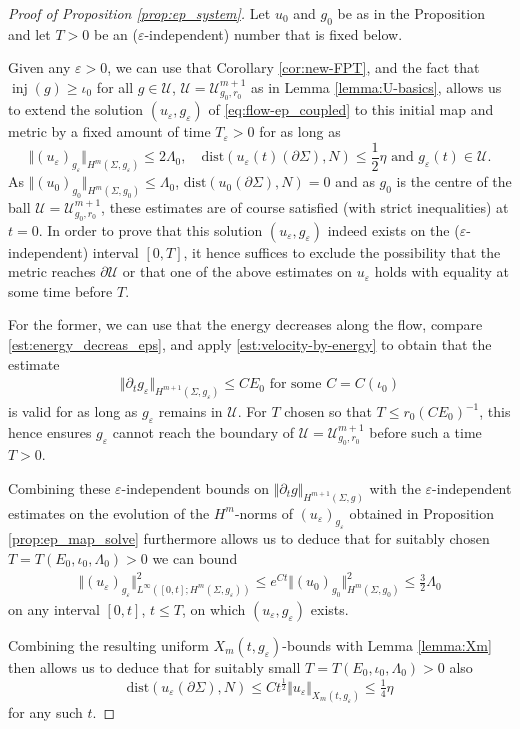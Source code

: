 \documentclass[10pt,reqno]{amsart}
\theoremstyle{plain}
\theoremstyle{definition}
\numberwithin{equation}{section}
\newcommand{\La}{\Lambda}
\newcommand{\Si}{\Sigma}
\newcommand{\ep}{\varepsilon}
\DeclareMathOperator{\inj}{inj}
\newcommand{\norm}[1]{\Vert#1\Vert}
\newcommand{\beq}{\begin{equation}}
\newcommand{\eeq}{\end{equation}}
\newcommand{\beqa}{\begin{equation}\begin{aligned}}
\newcommand{\eeqa}{\end{aligned}\end{equation}}
\newcommand{\beqas}{\begin{equation*}\begin{aligned}}
\newcommand{\eeqas}{\end{aligned}\end{equation*}}
\newcommand{\half}{\frac{1}{2}}
\newcommand{\pt}{\partial_t}
\newcommand{\eps}{\varepsilon}
\newcommand{\dist}{\text{dist}}
\newcommand{\pSi}{{\partial \Sigma}}
\newcommand{\UU}{{\mathcal U}}
\begin{document}
\begin{proof}[Proof of Proposition \ref{prop:ep_system}]
    Let $u_0$ and $g_0$ be as in the Proposition and let $T>0$ be an ($\eps$-independent) number that is fixed below. 
   
    Given any $\eps>0$, we can use that Corollary \ref{cor:new-FPT}, and the fact that $\inj(g)\geq \iota_0$ for 
   all $g\in  \UU$, $\UU=\UU_{g_0,r_0}^{m+1}$ as in Lemma \ref{lemma:U-basics},
   allows us to extend the solution $(u_\eps,g_\eps)$ of \eqref{eq:flow-ep_coupled} to this initial map and metric by a fixed amount of time $T_\eps>0$ for as long as 
    \beq\label{stuff-we-need}
        \norm{(u_\eps)_{g_\eps}}_{H^m(\Si,g_\eps)}\leq 2\La_0, \quad \dist(u_{\ep}(t)(\pSi), N)\leq \half\eta \text{ and } g_\eps(t)\in \UU.
    \eeq
    As $\norm{(u_0)_{g_0}}_{H^m(\Si,g_0)}\leq \La_0$, $\dist(u_{0}(\pSi), N)=0$ and as  $g_0$ is the centre of the ball $\UU=\UU_{g_0,r_0}^{m+1}$, these estimates are of course satisfied (with strict inequalities) at $t=0$. In order to prove that this solution $(u_\eps,g_\eps)$ indeed exists on the ($\eps$-independent) interval $[0,T]$, it hence suffices to exclude the possibility that the metric reaches $\partial \UU$ or that one of the above estimates on $u_\ep$ holds with equality at some time before $T$.

    For the former, we can use that the energy decreases along the flow, compare \eqref{est:energy_decreas_eps}, and apply \eqref{est:velocity-by-energy} to obtain that the estimate
    \beqa\label{est:H-is-nice}
        \norm{\pt g_\eps}_{H^{m+1}(\Si,g_\eps)}\leq C E_0 \text{ for some }C=C(\iota_0)
    \eeqa
    is valid for as long as $g_\eps$ remains in $\UU$.  For $T$ chosen so that $T\leq r_0 (CE_0)^{-1}$, this hence ensures $g_\eps$ cannot reach  the boundary of $\UU=\UU_{g_0,r_0}^{m+1} $ before such a time $T>0$.
    
    Combining these $\eps$-independent  bounds on $\norm{\pt g}_{H^{m+1}(\Si,g)}$ with the $\eps$-independent estimates on the evolution of the $H^m$-norms of $(u_\eps)_{g_\eps}$ obtained in Proposition \ref{prop:ep_map_solve} furthermore allows us to deduce that for suitably chosen  $T=T(E_0,\iota_0,\La_0)>0$ we can bound  
    \beqas
        \norm{(u_\eps)_{g_\eps}}_{L^\infty([0,t];H^m(\Si,g_\eps))}^2 \leq e^{Ct}\norm{(u_0)_{g_0}}_{H^m(\Si,g_0)}^2\leq \tfrac32 \La_0
    \eeqas
    on any interval $[0,t]$, $t\leq T$, on which $(u_\eps,g_\eps)$ exists. 
    
    Combining the resulting uniform $X_m(t,g_\eps)$-bounds with Lemma \ref{lemma:Xm} then allows us to deduce that for suitably small $T=T(E_0,\iota_0,\La_0)>0$ also 
    \begin{equation*}
        \dist(u_\eps(\pSi),N)\leq Ct^{\half} \norm{u_\eps}_{X_m(t,g_\eps)}\leq \tfrac14 \eta
    \end{equation*}
    for any such $t$. 


\end{proof}
\end{document}
